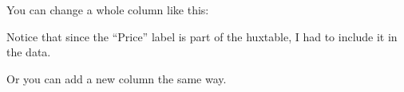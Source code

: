 \documentclass[]{article}
\newenvironment{Shaded}{\begin{snugshade}}{\end{snugshade}}
\newcommand{\CommentTok}[1]{\textcolor[rgb]{0.56,0.35,0.01}{\textit{#1}}}
\newcommand{\FloatTok}[1]{\textcolor[rgb]{0.00,0.00,0.81}{#1}}
\newcommand{\KeywordTok}[1]{\textcolor[rgb]{0.13,0.29,0.53}{\textbf{#1}}}
\newcommand{\NormalTok}[1]{#1}
\newcommand{\OperatorTok}[1]{\textcolor[rgb]{0.81,0.36,0.00}{\textbf{#1}}}
\newcommand{\StringTok}[1]{\textcolor[rgb]{0.31,0.60,0.02}{#1}}
\begin{document}
\FloatBarrier

You can change a whole column like this:

\begin{Shaded}
\end{Shaded}

\FloatBarrier

Notice that since the ``Price'' label is part of the huxtable, I had to
include it in the data.

Or you can add a new column the same way.

\begin{Shaded}
\end{Shaded}

 
  \providecommand{\huxb}[2]{\arrayrulecolor[RGB]{#1}\global\arrayrulewidth=#2pt}
  \providecommand{\huxvb}[2]{\color[RGB]{#1}\vrule width #2pt}
  \providecommand{\huxtpad}[1]{\rule{0pt}{#1}}
  \providecommand{\huxbpad}[1]{\rule[-#1]{0pt}{#1}}
\end{document}
